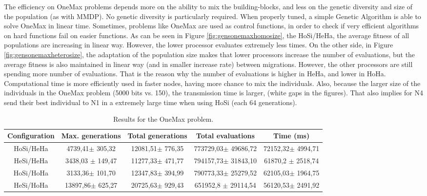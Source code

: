 The efficiency on OneMax problems depends more on the ability to mix the building-blocks, and less on the genetic diversity and size of the population (as with MMDP). No genetic diversity is particularly required. When properly tuned, a simple Genetic Algorithm is able to solve OneMax in linear time. Sometimes, problems like OneMax are used as control functions, in order to check if very efficient algorithms on hard functions fail on easier functions. As can be seen in Figure \ref{fig:gensonemaxhomosize}, the HoSi/HeHa, the average fitness of all populations are increasing in linear way. However, the lower processor evaluates extremely less times.  On the other side, in Figure \ref{fig:gensonemaxheterosize}, the adaptation of the population size makes that lower processors increase the number of evaluations, but the average fitness is also maintained in linear way (and in smaller increase rate) between migrations. However, the other processors are still spending more number of evaluations. That is the reason why the number of evaluations is higher in HeHa, and lower in HoHa. Computational time is more efficiently used in faster nodes, having more chance to mix the individuals. Also, because the larger size of the individuals in the OneMax problem (5000 bits vs. 150), the transmission time is larger, (white gaps in the figures). That also implies for N4 send their best individual to N1 in a extremely large time when using HoSi (each 64 generations).

\begin{table*}
\centering
\caption{Results for the OneMax problem.}
\begin{tabular}{|c|c|c|c|c|} \hline
Configuration & Max. generations      & Total generations     &   Total evaluations     & Time (ms) \\ \hline
HoSi/HeHa   & 4739,41$\pm$  305,32    & 12081,51$\pm$ 776,35  & 773729,03$\pm$  49686,72  & 72152,32$\pm$ 4994,71 \\ \hline
HeSi/HeHa   & 3438,03 $\pm$ 149,47 &  11277,33$\pm$ 471,77 &  794157,73$\pm$  31843,10  & 61870,2 $\pm$ 2518,74 \\ \hline \hline
HoSi/HoHa   & 3133,36$\pm$  101,70  & 12347,83$\pm$ 394,99  & 790773,33$\pm$  25279,52  & 62105,03$\pm$ 1964,75 \\ \hline
HeSi/HoHa   & 13897,86$\pm$ 625,27    & 20725,63$\pm$ 929,43  & 651952,8 $\pm$  29114,54  & 56120,53$\pm$ 2491,92 \\ \hline
\end{tabular}
\label{tab:onemaxresults}
\end{table*}

